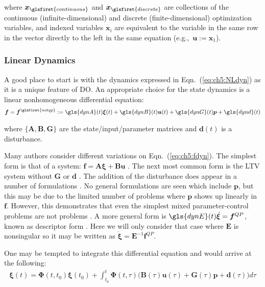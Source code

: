 \noindent where $\bm{x}_{\glsfirst{continuous}}$ and $\bm{x}_{\glsfirst{discrete}}$ are collections of the continuous (infinite-dimensional) and discrete (finite-dimensional) optimization variables, and indexed variables $\bm{x}_i$ are equivalent to the variable in the same row in the vector directly to the left in the same equation (e.g.,~$\bm{u} := \bm{x}_1$). 

\subsubsection{Linear Dynamics}

A good place to start is with the dynamics expressed in Eqn.~(\ref{eq:ch5:NLdyn}) as it is a unique feature of DO. An appropriate choice for the state dynamics is a linear nonhomogeneous differential equation:
\begin{align} \label{eq:ch5:fdyn}
\bm{f} = \bm{f}^{\glsfirst{notqp}} := \gls{dynA}(t)\bm{\xi}(t) + \gls{dynB}(t) \bm{u}(t) + \gls{dynG}(t)\bm{p} + \gls{dynd}(t) 
\end{align}

\noindent where $\{\bm{A},\bm{B},\bm{G}\}$ are the  state/input/parameter matrices and $\bm{d}(t)$ is a disturbance.

Many authors consider different variations on Eqn.~(\ref{eq:ch5:fdyn}).
The simplest form is that of a  system: $\bm{f} = \bm{A}\bm{\xi} + \bm{B} \bm{u}$ \cite{Lack1967a, Sala2007a}.
The next most common form is the LTV system without $\bm{G}$ or $\bm{d}$ \cite{Wang1992a}.
The addition of the disturbance does appear in a number of formulations \cite{Hampton1996a, Popescu2009a, Li2015a, Bryson1975a, Han2012a}.
No general formulations are seen which include $\bm{p}$, but this may be due to the limited number of problems where $\bm{p}$ shows up linearly in $\bm{f}$. 
However, this demonstrates that even the simplest mixed parameter-control problems are not \lqdo{} problems \cite{Herber2014a}.
A more general form is $\gls{dynE}(t)\dot{\bm{\xi}} = \bm{f}^{QP}$, known as descriptor form \cite{Gerdts2015a, Campbell2013a}.
Here we will only consider that case where $\bm{E}$ is nonsingular so it may be written as $\dot{\bm{\xi}} = \bm{E}^{-1}\bm{f}^{QP}$. 

One may be tempted to integrate this differential equation and would arrive at the following:
\begin{align} \label{eq:ch5:statesol}
\bm{\xi}(t) = \bm{\Phi}(t,t_0) \bm{\xi}(t_0) + \int_{t_0}^{t}  \bm{\Phi}(t,\tau) \big( \bm{B}(\tau) \bm{u}(\tau) + \bm{G}(\tau) \bm{p} + \bm{d}(\tau) \big) d\tau
\end{align}

